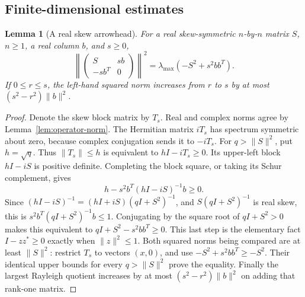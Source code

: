 \documentclass[reqno,a4paper,12pt]{amsart}
\newtheorem{lemma}[theorem]{Lemma}
\theoremstyle{definition}
\begin{document}
\subsection{Finite-dimensional estimates}
\begin{lemma}[A real skew arrowhead]\label{lem:arrowhead}
For a real skew-symmetric $n$-by-$n$ matrix $S$, $n\ge1$, a real
column $b$, and $s\ge0$,
\[
 \left\|\begin{pmatrix}S&sb\\-sb^T&0\end{pmatrix}\right\|^2
 =\lambda_{\max}(-S^2+s^2bb^T).
\]
If $0\le r\le s$, the left-hand squared norm increases from $r$ to $s$
by at most $(s^2-r^2)\|b\|^2$.
\end{lemma}
\begin{proof}
Denote the skew block matrix by $T_s$. Real and complex norms agree by
Lemma~\ref{lem:operator-norm}. The Hermitian matrix $iT_s$ has spectrum
symmetric about zero, because complex conjugation sends it to $-iT_s$.
For $q>\|S\|^2$, put $h=\sqrt q$. Thus $\|T_s\|\le h$ is equivalent
to $hI-iT_s\ge0$. Its upper-left block $hI-iS$ is positive definite.
Completing the block square, or taking its Schur complement, gives
\[
 h-s^2b^T(hI-iS)^{-1}b\ge0.
\]
Since $(hI-iS)^{-1}=(hI+iS)(qI+S^2)^{-1}$, and
$S(qI+S^2)^{-1}$ is real skew, this is
$s^2b^T(qI+S^2)^{-1}b\le1$.
Conjugating by the square root of $qI+S^2>0$ makes this equivalent to
$qI+S^2-s^2bb^T\ge0$. This last step is the elementary fact
$I-zz^*\ge0$ exactly when $\|z\|^2\le1$.
Both squared norms being compared are at least $\|S\|^2$:
restrict $T_s$ to vectors $(x,0)$, and use $-S^2+s^2bb^T\ge-S^2$.
Their identical upper bounds for every $q>\|S\|^2$ prove the equality.
Finally the largest Rayleigh quotient increases by at most
$(s^2-r^2)\|b\|^2$ on adding that rank-one matrix.
\end{proof}
\end{document}
